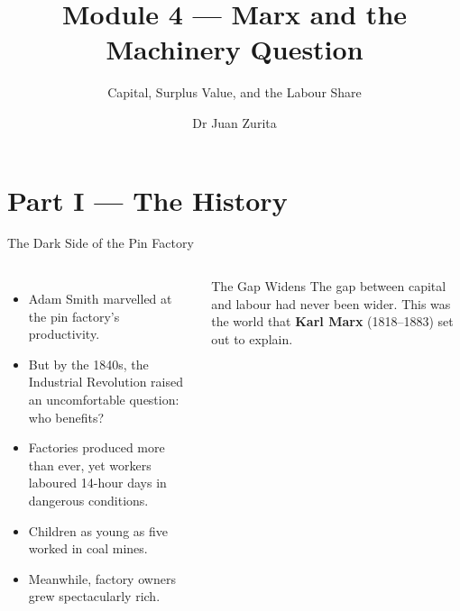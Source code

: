 \documentclass[aspectratio=169, 10pt]{beamer}
\title{Module 4 --- Marx and the Machinery Question}
\subtitle{Capital, Surplus Value, and the Labour Share}
\author{Dr Juan Zurita}
\institute{From Smith to Simulation\\
The University of Edinburgh~$\cdot$~School of Economics}
\date{}
\begin{document}
\maketitle

\section{Part I --- The History}

\begin{frame}{The Dark Side of the Pin Factory}
\begin{columns}[T]
\begin{itemize}
  \item Adam Smith marvelled at the pin factory's productivity.
  \item But by the 1840s, the Industrial Revolution raised an
        uncomfortable question: \alert{who benefits?}
  \item Factories produced more than ever, yet workers laboured
        14-hour days in dangerous conditions.
  \item Children as young as five worked in coal mines.
  \item Meanwhile, factory owners grew spectacularly rich.
\end{itemize}
\begin{block}{The Gap Widens}
The gap between capital and labour had never been wider.
This was the world that \textbf{Karl Marx} (1818--1883)
set out to explain.
\end{block}
\end{columns}
\end{frame}
\end{document}
